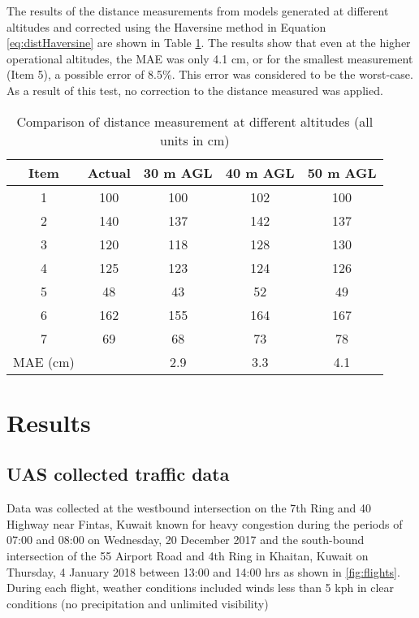 The results of the distance measurements from models generated at different altitudes and corrected using the Haversine method in Equation \ref{eq:distHaversine} are shown in Table \ref{tab:uascalibrate}. The results show that even at the higher operational altitudes, the MAE was only 4.1 cm, or for the smallest measurement (Item 5), a possible error of 8.5\%. This error was considered to be the worst-case. As a result of this test, no correction to the distance measured was applied.

%
\begin{table}[H]
\centering
\caption[Comparison of distance measurement at different altitudes]{Comparison of distance measurement at different altitudes (all units in cm)}
\label{tab:uascalibrate}
\begin{tabular}{@{}ccccc@{}}
\toprule
\textbf{Item} & \textbf{Actual} & \textbf{30 m AGL} & \textbf{40 m AGL} & \textbf{50 m AGL} \\ \midrule
1 & 100 & 100 & 102 & 100 \\
2 & 140 & 137 & 142 & 137 \\
3 & 120 & 118 & 128 & 130 \\
4 & 125 & 123 & 124 & 126 \\
5 & 48 & 43 & 52 & 49 \\
6 & 162 & 155 & 164 & 167 \\
7 & 69 & 68 & 73 & 78 \\
MAE (cm)&  & 2.9 & 3.3 & 4.1 \\ \bottomrule
\end{tabular}
\end{table}


\section{Results}
\subsection{UAS collected traffic data}

Data was collected at the westbound intersection on the 7th Ring and 40 Highway near Fintas, Kuwait known for heavy congestion during the periods of 07:00 and 08:00 on Wednesday, 20 December 2017 and the south-bound intersection of the 55 Airport Road and 4th Ring in Khaitan, Kuwait on Thursday, 4 January 2018 between 13:00 and 14:00 hrs as shown in \ref{fig:flights}. During each flight, weather conditions included winds less than 5 kph in clear conditions (no precipitation and unlimited visibility)


